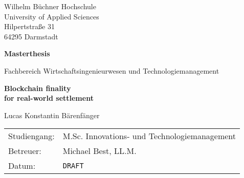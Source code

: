 \begin{titlepage}
  
  \large
  Wilhelm Büchner Hochschule \\
  University of Applied Sciences \\
  Hilpertstraße 31 \\
  64295 Darmstadt
  
  \vfill
  
  \begin{center}
    \Large
    \textbf{Masterthesis}
    
    \vspace{0.5cm}
    
    Fachbereich Wirtschaftsingenieurwesen und Technologiemanagement
    
    \vfill
    
    \Huge
    \textbf{
      Blockchain finality \\
      for real-world settlement
    }

    \vfill

    \Large
    Lucas Konstantin Bärenfänger
  \end{center}

  \vfill
  
  \begin{tabularx}{\textwidth}{@{}l X}
    Studiengang:    & M.Sc. Innovations- und Technologiemanagement \\
    Betreuer:       & Michael Best, LL.M. \\
    Datum:          & \texttt{DRAFT}
  \end{tabularx}

\end{titlepage}
